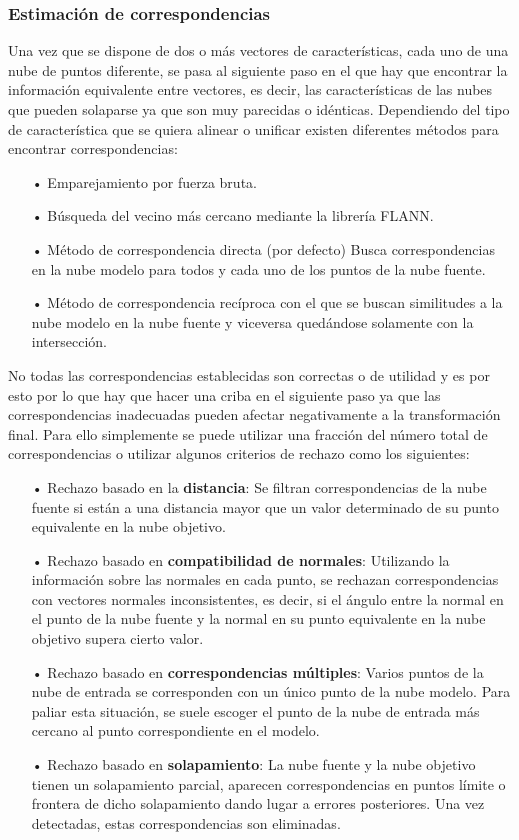 \subsubsection{Estimación de correspondencias}
Una vez que se dispone de dos o más vectores de características, cada uno de una nube de puntos diferente, se pasa al siguiente paso en el que hay que encontrar la información equivalente entre vectores, es decir, las características de las nubes que pueden solaparse ya que son muy parecidas o idénticas. Dependiendo del tipo de característica que se quiera alinear o unificar existen diferentes métodos para encontrar correspondencias\cite{paper_registration}:
\begin{itemize}
\item[•]Emparejamiento por fuerza bruta.
\item[•]Búsqueda del vecino más cercano mediante la librería FLANN.
\item[•]Método de correspondencia directa (por defecto) Busca correspondencias en la nube modelo para todos y cada uno de los puntos de la nube fuente.
\item[•]Método de correspondencia recíproca con el que se buscan similitudes a la nube modelo en la nube fuente y viceversa quedándose solamente con la intersección.
\end{itemize}

No todas las correspondencias establecidas son correctas o de utilidad y es por esto por lo que hay que hacer una criba en el siguiente paso ya que las correspondencias inadecuadas pueden afectar negativamente a la transformación final. Para ello simplemente se puede utilizar una fracción del número total de correspondencias o utilizar algunos criterios de rechazo como los siguientes\cite{paper_registration}:
\begin{itemize}
\item[•]Rechazo basado en la \textbf{distancia}:
Se filtran correspondencias de la nube fuente si están a una distancia mayor que un valor determinado de su punto equivalente en la nube objetivo.
\item[•]Rechazo basado en \textbf{compatibilidad de normales}:
Utilizando la información sobre las normales en cada punto, se rechazan correspondencias con vectores normales inconsistentes, es decir, si el ángulo entre la normal en el punto de la nube fuente y la normal en su punto equivalente en la nube objetivo supera cierto valor.
\item[•]Rechazo basado en \textbf{correspondencias múltiples}: 
Varios puntos de la nube de entrada se corresponden con un único punto de la nube modelo. Para paliar esta situación, se suele escoger el punto de la nube de entrada más cercano al punto correspondiente en el modelo.
\item[•]Rechazo basado en \textbf{solapamiento}:
La nube fuente y la nube objetivo tienen un solapamiento parcial, aparecen correspondencias en puntos límite o frontera de dicho solapamiento dando lugar a errores posteriores. Una vez detectadas, estas correspondencias son eliminadas. 
\end{itemize}

